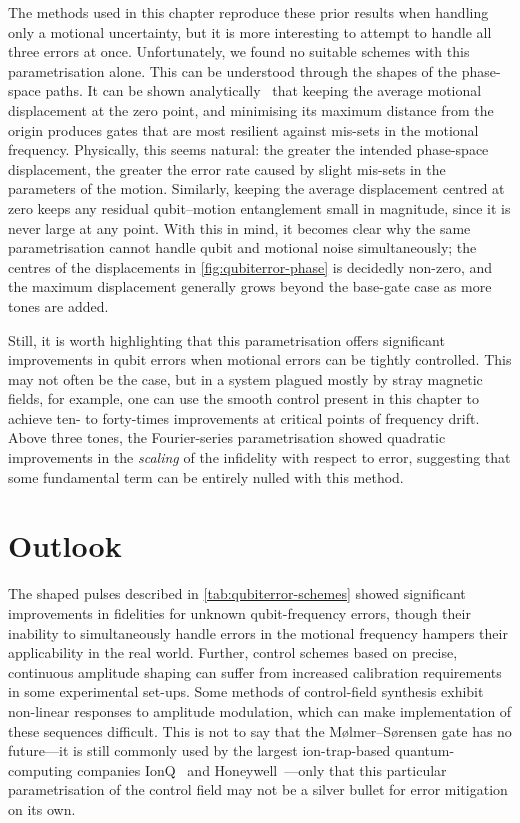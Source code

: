 The methods used in this chapter reproduce these prior results when handling only a motional uncertainty, but it is more interesting to attempt to handle all three errors at once.
Unfortunately, we found no suitable schemes with this parametrisation alone.
This can be understood through the shapes of the phase-space paths.
It can be shown analytically~\cite{Haddadfarshi2016} that keeping the average motional displacement at the zero point, and minimising its maximum distance from the origin produces gates that are most resilient against mis-sets in the motional frequency.
Physically, this seems natural: the greater the intended phase-space displacement, the greater the error rate caused by slight mis-sets in the parameters of the motion.
Similarly, keeping the average displacement centred at zero keeps any residual qubit--motion entanglement small in magnitude, since it is never large at any point.
With this in mind, it becomes clear why the same parametrisation cannot handle qubit and motional noise simultaneously; the centres of the displacements in \cref{fig:qubiterror-phase} is decidedly non-zero, and the maximum displacement generally grows beyond the base-gate case as more tones are added.

Still, it is worth highlighting that this parametrisation offers significant improvements in qubit errors when motional errors can be tightly controlled.
This may not often be the case, but in a system plagued mostly by stray magnetic fields, for example, one can use the smooth control present in this chapter to achieve ten- to forty-times improvements at critical points of frequency drift.
Above three tones, the Fourier-series parametrisation showed quadratic improvements in the \emph{scaling} of the infidelity with respect to error, suggesting that some fundamental term can be entirely nulled with this method.


\section{Outlook}

The shaped pulses described in \cref{tab:qubiterror-schemes} showed significant improvements in fidelities for unknown qubit-frequency errors, though their inability to simultaneously handle errors in the motional frequency hampers their applicability in the real world.
Further, control schemes based on precise, continuous amplitude shaping can suffer from increased calibration requirements in some experimental set-ups.
Some methods of control-field synthesis exhibit non-linear responses to amplitude modulation, which can make implementation of these sequences difficult\cite{Webb2018}.
This is not to say that the M\o lmer--S\o rensen gate has no future---it is still commonly used by the largest ion-trap-based quantum-computing companies IonQ~\cite{Blumel2021} and Honeywell~\cite{Pino2021}---only that this particular parametrisation of the control field may not be a silver bullet for error mitigation on its own.

